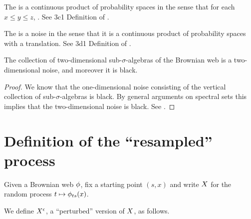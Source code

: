 {\begin{theorem}
  The \brownianwebnoise{}
  is a continuous product of probability spaces in the sense that
  for each $x \le y \le z$,  .
  See 3c1 Definition of
  \cite{tsirelson-nonclassical-stochastic-flows}.
\end{theorem}

\begin{theorem}
  The \brownianwebnoise{} is a noise in the sense that it is a
  continuous product of probability spaces with a translation.
  See 3d1 Definition of
  \cite{tsirelson-nonclassical-stochastic-flows}.
\end{theorem}


\begin{theorem}
  The collection of two-dimensional sub-$\sigma$-algebras of the
  Brownian web is a two-dimensional noise, and moreover it is black.
\end{theorem}

\begin{proof}
  We know that the one-dimensional noise consisting of the vertical
  collection of sub-$\sigma$-algebras is black.  By general arguments
  on spectral sets this implies that the two-dimensional noise is
  black.  See \cite{tsirelson-classicality-blackness-spectrum}.
\end{proof}

\section{Definition of the ``resampled'' process}

\newcommand{\reservoir}{\mathcal{G}}

\newcommand{\twostrips}{\commafactor{\infty}{0} \tensor \commafactor{0}{-\infty}}
\newcommand{\onestrip}{\commafactor{\infty}{-\infty}}
\newcommand{\twostripsreservoir}{\twostrips \tensor \reservoir}

\begin{definition}
Given a Brownian web $\phi$, fix a starting point $(s,x)$ and write
$X$ for the random process $t \mapsto \phi_{ts}(x)$.
\end{definition}

{
\newcommand{\webt}{\psi}
\begin{definition}
  We define $X^{\epsilon}$, a ``perturbed'' version of $X$, as
  follows.


\end{definition}}}
